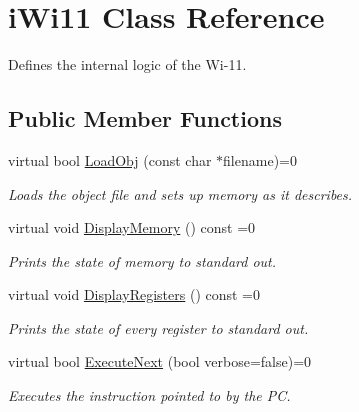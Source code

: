 \hypertarget{classiWi11}{
\section{iWi11 Class Reference}
\label{classiWi11}
}


Defines the internal logic of the Wi-\/11.  


\subsection*{Public Member Functions}
\begin{DoxyCompactItemize}
\item 
virtual bool \hyperlink{classiWi11_a87f8cd9014f7ae2edaa8928257fc84e9}{LoadObj} (const char $\ast$filename)=0
\begin{DoxyCompactList}\small\item\em Loads the object file and sets up memory as it describes. \item\end{DoxyCompactList}\item 
virtual void \hyperlink{classiWi11_ad9b13831ad9a83a8abbc3a77794b38bc}{DisplayMemory} () const =0
\begin{DoxyCompactList}\small\item\em Prints the state of memory to standard out. \item\end{DoxyCompactList}\item 
virtual void \hyperlink{classiWi11_a143e669e3c7f46c3d1524838c8d74d94}{DisplayRegisters} () const =0
\begin{DoxyCompactList}\small\item\em Prints the state of every register to standard out. \item\end{DoxyCompactList}\item 
virtual bool \hyperlink{classiWi11_ae502d86eb25fe6e1169e800939362074}{ExecuteNext} (bool verbose=false)=0
\begin{DoxyCompactList}\small\item\em Executes the instruction pointed to by the PC. \item\end{DoxyCompactList}\end{DoxyCompactItemize}
